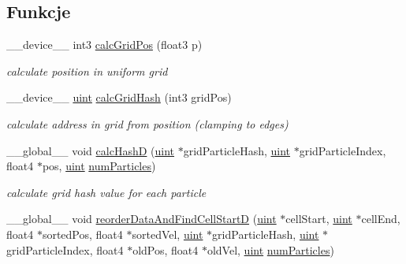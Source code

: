 \subsection*{Funkcje}
\begin{DoxyCompactItemize}
\item 
\-\_\-\-\_\-device\-\_\-\-\_\- int3 \hyperlink{particles__kernel__impl_8cuh_a63d62750e6cbb8781c5ff252fc13c1fd}{calc\-Grid\-Pos} (float3 p)
\begin{DoxyCompactList}\small\item\em calculate position in uniform grid \end{DoxyCompactList}\item 
\-\_\-\-\_\-device\-\_\-\-\_\- \hyperlink{particles__kernel_8cuh_a91ad9478d81a7aaf2593e8d9c3d06a14}{uint} \hyperlink{particles__kernel__impl_8cuh_ad20ac253847311c176aacf9a224e14e5}{calc\-Grid\-Hash} (int3 grid\-Pos)
\begin{DoxyCompactList}\small\item\em calculate address in grid from position (clamping to edges) \end{DoxyCompactList}\item 
\-\_\-\-\_\-global\-\_\-\-\_\- void \hyperlink{particles__kernel__impl_8cuh_a4c688195fb1c2963cbdcaf62c737b9d7}{calc\-Hash\-D} (\hyperlink{particles__kernel_8cuh_a91ad9478d81a7aaf2593e8d9c3d06a14}{uint} $\ast$grid\-Particle\-Hash, \hyperlink{particles__kernel_8cuh_a91ad9478d81a7aaf2593e8d9c3d06a14}{uint} $\ast$grid\-Particle\-Index, float4 $\ast$pos, \hyperlink{particles__kernel_8cuh_a91ad9478d81a7aaf2593e8d9c3d06a14}{uint} \hyperlink{particles_8cpp_a05b8a90212054a3eb1a036ae0c269596}{num\-Particles})
\begin{DoxyCompactList}\small\item\em calculate grid hash value for each particle \end{DoxyCompactList}\item 
\-\_\-\-\_\-global\-\_\-\-\_\- void \hyperlink{particles__kernel__impl_8cuh_abe84636059af3ed58ef603665395e6f4}{reorder\-Data\-And\-Find\-Cell\-Start\-D} (\hyperlink{particles__kernel_8cuh_a91ad9478d81a7aaf2593e8d9c3d06a14}{uint} $\ast$cell\-Start, \hyperlink{particles__kernel_8cuh_a91ad9478d81a7aaf2593e8d9c3d06a14}{uint} $\ast$cell\-End, float4 $\ast$sorted\-Pos, float4 $\ast$sorted\-Vel, \hyperlink{particles__kernel_8cuh_a91ad9478d81a7aaf2593e8d9c3d06a14}{uint} $\ast$grid\-Particle\-Hash, \hyperlink{particles__kernel_8cuh_a91ad9478d81a7aaf2593e8d9c3d06a14}{uint} $\ast$grid\-Particle\-Index, float4 $\ast$old\-Pos, float4 $\ast$old\-Vel, \hyperlink{particles__kernel_8cuh_a91ad9478d81a7aaf2593e8d9c3d06a14}{uint} \hyperlink{particles_8cpp_a05b8a90212054a3eb1a036ae0c269596}{num\-Particles})

\end{DoxyCompactItemize}
